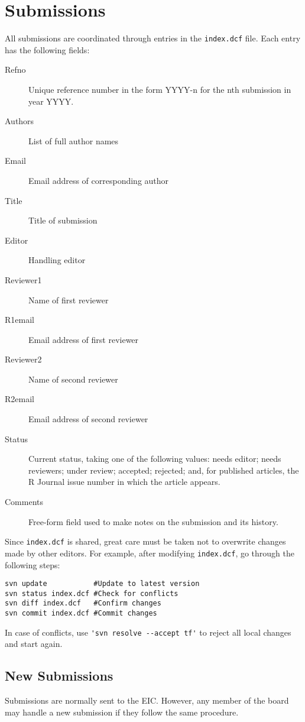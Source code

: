 \documentclass[11pt]{article}
\begin{document}
\section{Submissions}

All submissions are coordinated through entries in the \texttt{index.dcf}
file. Each entry has the following fields:
\begin{description}
\item[Refno] Unique reference number in the form YYYY-n for the nth
  submission in year YYYY.
\item[Authors] List of full author names
\item[Email] Email address of corresponding author
\item[Title] Title of submission
\item[Editor] Handling editor
\item[Reviewer1] Name of first reviewer
\item[R1email] Email address of first reviewer
\item[Reviewer2] Name of second reviewer
\item[R2email] Email address of second reviewer
\item[Status] Current status, taking one of the following values:
  needs editor; needs reviewers; under review; accepted; rejected;
  and, for published articles, the R Journal issue number in which
  the article appears.
\item[Comments] Free-form field used to make notes on the submission and
  its history.
\end{description}

Since \texttt{index.dcf} is shared, great care must be taken not to
overwrite changes made by other editors. For example, after modifying
\texttt{index.dcf}, go through the following steps:

\begin{verbatim}
svn update           #Update to latest version
svn status index.dcf #Check for conflicts
svn diff index.dcf   #Confirm changes
svn commit index.dcf #Commit changes
\end{verbatim}

In case of conflicts, use \verb+'svn resolve --accept tf'+ to reject
all local changes and start again.

\subsection{New Submissions}

Submissions are normally sent to the EIC. However, any member of the
board may handle a new submission if they follow the same procedure.
\end{document}
